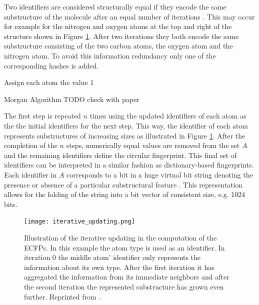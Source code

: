 Two identifiers are considered structurally equal if they encode the same substructure of the molecule after an equal number of iterations . This may occur for example for the nitrogen and oxygen atoms at the top and right of the structure shown in Figure \ref{fig:iteration_ECFP}. After two iterations they both encode the same substructure consisting of the two carbon atoms, the oxygen atom and the nitrogen atom. To avoid this information redundancy only one of the corresponding hashes is added.
\begin{algorithm}[t]
	\SetAlgoLined
	Assign each atom the value 1\;
	\caption{Morgan Algorithm TODO check with paper}
	\label{algo:morgan}
\end{algorithm}

The first step is repeated $n$ times using the updated identifiers of each atom as the the initial identifiers for the next step. This way, the identifier of each atom represents substructures of increasing sizes as illustrated in Figure \ref{fig:iteration_ECFP}. After the completion of the $n$ steps, numerically equal values are removed from the set $A$ and the remaining identifiers define the circular fingerprint. This final set of identifiers can be interpreted in a similar fashion as dictionary-based fingerprints. Each identifier in $A$ corresponds to a bit in a huge virtual bit string denoting the presence or absence of a particular substructural feature \citep{ecfp_bit}. This representation allows for the folding of the string into a bit vector of consistent size, e.g. 1024 bits. 
\begin{figure}[h]
	\centering 
	\texttt{[image: iterative\_updating.png]}
	\caption{Illustration of the iterative updating in the computation of the ECFPs. In this example the atom type is used as an identifier. In iteration 0 the middle atom' identifier only represents the information about its own type. After the first iteration it has aggregated the information from its immediate neighbors and after the second iteration the represented substructure has grown even further. Reprinted from \cite{ECFP}. }
	\label{fig:iteration_ECFP}
\end{figure}

